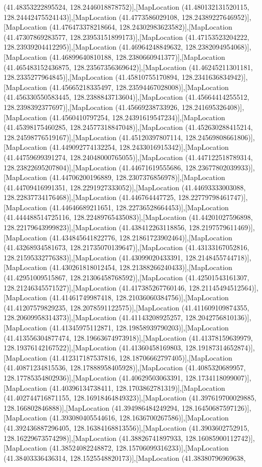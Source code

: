 (41.48353222895524, 128.2446018878752)],[MapLocation (41.480132131520115, 128.24442475524143)],[MapLocation (41.4773586029108, 128.24389227646952)],[MapLocation (41.476473378218664, 128.24302983623582)],[MapLocation (41.47307869283577, 128.23953151899173)],[MapLocation (41.47153523204222, 128.23939204412295)],[MapLocation (41.46964248849632, 128.2382094954068)],[MapLocation (41.46899640810188, 128.2380660941377)],[MapLocation (41.465483152436875, 128.23567356369642)],[MapLocation (41.46245211301181, 128.2335277964845)],[MapLocation (41.45810755170894, 128.2341636834942)],[MapLocation (41.45665218335497, 128.23594467028008)],[MapLocation (41.456330550583445, 128.2388843713604)],[MapLocation (41.45664414255512, 128.2398392377697)],[MapLocation (41.45669238733926, 128.241695326408)],[MapLocation (41.4560410797254, 128.24391619547234)],[MapLocation (41.45398175460285, 128.24577318847048)],[MapLocation (41.452630288415214, 128.24598776519167)],[MapLocation (41.45120397807114, 128.24569808661806)],[MapLocation (41.449092774132254, 128.2433016915342)],[MapLocation (41.44759699391274, 128.24048000765055)],[MapLocation (41.447122518789314, 128.23822695207804)],[MapLocation (41.44671619555686, 128.23677802039933)],[MapLocation (41.44706200196889, 128.2307376856978)],[MapLocation (41.44709416991351, 128.2291927333052)],[MapLocation (41.44693333003088, 128.22837734176468)],[MapLocation (41.446764447725, 128.22779798461747)],[MapLocation (41.44646689211651, 128.22736528664453)],[MapLocation (41.444488514725116, 128.22489765435083)],[MapLocation (41.44201027596898, 128.22179643999823)],[MapLocation (41.438412263118856, 128.2197579611469)],[MapLocation (41.434845641822776, 128.21861723902464)],[MapLocation (41.43268934581673, 128.21735070139647)],[MapLocation (41.43133167052816, 128.21595332776383)],[MapLocation (41.43099020433391, 128.2148455744718)],[MapLocation (41.430261818012454, 128.21388266240433)],[MapLocation (41.42951009515867, 128.21306458768592)],[MapLocation (41.42501543161307, 128.21246345571527)],[MapLocation (41.417385267760146, 128.21145494512564)],[MapLocation (41.41461749987418, 128.21036060384756)],[MapLocation (41.41207579829235, 128.2078591122575)],[MapLocation (41.411609109874355, 128.20609958314373)],[MapLocation (41.41143208925257, 128.2042756810136)],[MapLocation (41.41345975112871, 128.19858939790203)],[MapLocation (41.413556304877474, 128.19663674973918)],[MapLocation (41.41378159639979, 128.19376142167522)],[MapLocation (41.41360458169803, 128.19187314652874)],[MapLocation (41.412317187537816, 128.18706662797405)],[MapLocation (41.40871234815536, 128.17888958405928)],[MapLocation (41.4085320689957, 128.17785354802936)],[MapLocation (41.40629503063391, 128.1734118099007)],[MapLocation (41.40396134738411, 128.1703862781319)],[MapLocation (41.402744716871155, 128.16918464849323)],[MapLocation (41.397619700029885, 128.166802846888)],[MapLocation (41.394986484249294, 128.16450687597126)],[MapLocation (41.393080405544616, 128.1636700267586)],[MapLocation (41.392436887296405, 128.16384168813556)],[MapLocation (41.3903602752915, 128.16229673574298)],[MapLocation (41.38826741897933, 128.16085900112742)],[MapLocation (41.38524082248872, 128.15706099316233)],[MapLocation (41.38403336436314, 128.1525548820173)],[MapLocation (41.38380796969638, 